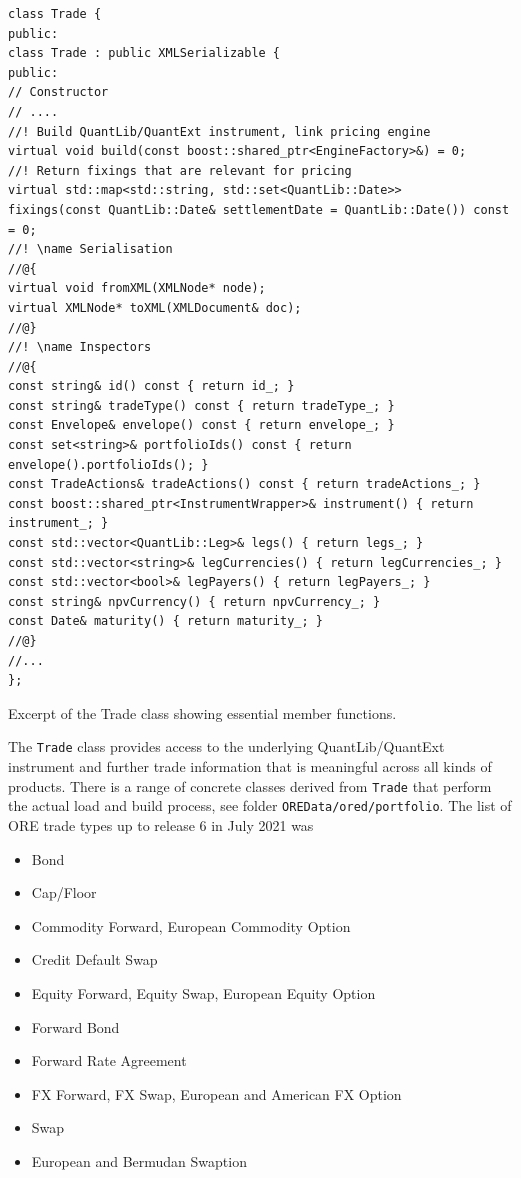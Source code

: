 \documentclass[12pt, a4paper]{report}
\begin{document}
\begin{listing}[H]
\begin{verbatim}
class Trade {
public:
class Trade : public XMLSerializable {
public:
// Constructor
// ....
//! Build QuantLib/QuantExt instrument, link pricing engine
virtual void build(const boost::shared_ptr<EngineFactory>&) = 0;
//! Return fixings that are relevant for pricing
virtual std::map<std::string, std::set<QuantLib::Date>>
fixings(const QuantLib::Date& settlementDate = QuantLib::Date()) const = 0;
//! \name Serialisation
//@{
virtual void fromXML(XMLNode* node);
virtual XMLNode* toXML(XMLDocument& doc);
//@}
//! \name Inspectors
//@{
const string& id() const { return id_; }
const string& tradeType() const { return tradeType_; }
const Envelope& envelope() const { return envelope_; }
const set<string>& portfolioIds() const { return envelope().portfolioIds(); }
const TradeActions& tradeActions() const { return tradeActions_; }
const boost::shared_ptr<InstrumentWrapper>& instrument() { return instrument_; }
const std::vector<QuantLib::Leg>& legs() { return legs_; }
const std::vector<string>& legCurrencies() { return legCurrencies_; }
const std::vector<bool>& legPayers() { return legPayers_; }
const string& npvCurrency() { return npvCurrency_; }
const Date& maturity() { return maturity_; }
//@}
//...
};
\end{verbatim}
\caption{Excerpt of the Trade class showing essential member functions.}
\label{1st:trade}
\end{listing}

The {\tt Trade} class provides access to the underlying QuantLib/QuantExt instrument and further trade information that is meaningful across all kinds of products. There is a range of concrete classes derived from {\tt Trade} that perform the actual load and build process, see folder {\tt OREData/ored/portfolio}. The list of ORE trade types up to release 6 in July 2021 was
\begin{itemize}
\item Bond
\item Cap/Floor
\item Commodity Forward, European Commodity Option
\item Credit Default Swap
\item Equity Forward, Equity Swap, European Equity Option
\item Forward Bond
\item Forward Rate Agreement
\item FX Forward, FX Swap, European and American FX Option
\item Swap
\item European and Bermudan Swaption
\end{itemize}
\end{document}
